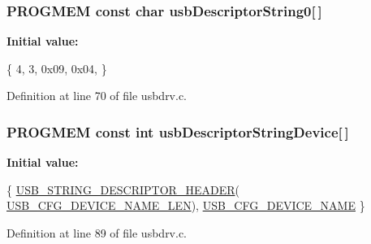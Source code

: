 \hypertarget{mhvlib-_vusb-_console_2vusb_2usbdrv_8c_a367afe22c903b4b58805cc451c22cb99}{
\subsubsection[{usb\-Descriptor\-String0}]{\setlength{\rightskip}{0pt plus 5cm}P\-R\-O\-G\-M\-E\-M const char usb\-Descriptor\-String0\mbox{[}$\,$\mbox{]}}}\label{mhvlib-_vusb-_console_2vusb_2usbdrv_8c_a367afe22c903b4b58805cc451c22cb99}
{\bfseries Initial value\-:}
\begin{DoxyCode}
 \{ 
    4,          
    3,          
    0x09, 0x04, 
\}
\end{DoxyCode}


Definition at line 70 of file usbdrv.\-c.

\hypertarget{mhvlib-_vusb-_console_2vusb_2usbdrv_8c_a1f252008bbf46a3172ebf8a4f8213a60}{
\subsubsection[{usb\-Descriptor\-String\-Device}]{\setlength{\rightskip}{0pt plus 5cm}P\-R\-O\-G\-M\-E\-M const int usb\-Descriptor\-String\-Device\mbox{[}$\,$\mbox{]}}}\label{mhvlib-_vusb-_console_2vusb_2usbdrv_8c_a1f252008bbf46a3172ebf8a4f8213a60}
{\bfseries Initial value\-:}
\begin{DoxyCode}
 \{
    \hyperlink{mhvlib-_vusb-_keyboard_2vusb_2usbdrv_8h_ad94ebd3045d80d1e2ab32c22be4ff96e}{USB\_STRING\_DESCRIPTOR\_HEADER}(
      \hyperlink{mhvlib-_vusb-_keyboard_2vusb_2usbconfig-prototype_8h_ae68f17e6baf13805abc56e74beadeb57}{USB\_CFG\_DEVICE\_NAME\_LEN}),
    \hyperlink{mhvlib-_vusb-_keyboard_2vusb_2usbconfig-prototype_8h_a9b482a2b2740652ffe7dcb6695ca0c91}{USB\_CFG\_DEVICE\_NAME}
\}
\end{DoxyCode}


Definition at line 89 of file usbdrv.\-c.

